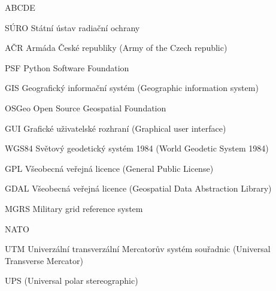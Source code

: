 
\begin{seznamzkratek}{ABCDE}

	      {SÚRO}
	      {Státní ústav radiační ochrany}
	      
	     {AČR}
	     {Armáda České republiky (Army of the Czech republic)}	      
	      
		  {PSF}
	      {Python Software Foundation}

	      {GIS}
	      {Geografický informační systém (Geographic information system)}

	      {OSGeo}
	      {Open Source Geospatial Foundation}
	         
	      {GUI}
	      {Grafické uživatelské rozhraní (Graphical user interface)}
	           
	      {WGS84}
	      {Světový geodetický systém 1984 (World Geodetic System 1984)}

	      {GPL}
	      {Všeobecná veřejná licence (General Public License)}
	      
	      {GDAL}
	      {Všeobecná veřejná licence (Geospatial Data Abstraction Library)}
	    
	      {MGRS}
	      {Military grid reference system}
	      
	      {NATO}
	      {}
	      
	      {UTM}
	      {Univerzální transverzální Mercatorův systém souřadnic (Universal Transverse Mercator)}	
	      
	      {UPS}
	      {(Universal polar stereographic)}	            	      

\end{seznamzkratek}